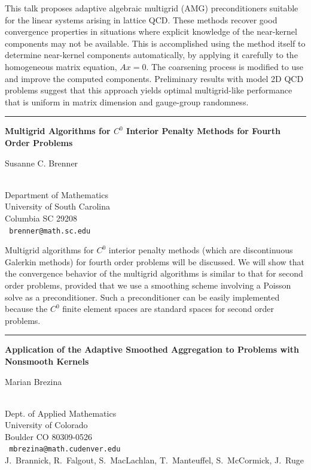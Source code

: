 \documentclass[twosided]{report}
\begin{document}
This talk proposes adaptive algebraic multigrid (AMG) preconditioners
suitable for the linear systems arising in lattice QCD.  These methods
recover good convergence properties in situations where explicit
knowledge of the near-kernel components may not be available.  This is
accomplished using the method itself to determine near-kernel
components automatically, by applying it carefully to the homogeneous
matrix equation, $Ax=0$.  The coarsening process is modified to use and
improve the computed components. Preliminary results with model 2D QCD
problems suggest that this approach yields optimal multigrid-like
performance that is uniform in matrix dimension and gauge-group
randomness.


\begin{center}

\rule{6in}{1pt}
\end{center}

\begin{center}
{\large			\label{brenner}
{\bf
Multigrid Algorithms for $C^0$ Interior Penalty Methods for Fourth Order
Problems
}

Susanne C. Brenner} \\
Department of Mathematics
\\
University of South Carolina
\\
Columbia SC 29208
\\ {\tt
brenner@math.sc.edu
}
\end{center}

Multigrid algorithms for $C^0$ interior penalty methods (which are
discontinuous Galerkin methods) for fourth order problems will be
discussed. We will show that the convergence behavior of the multigrid
algorithms is similar to that for second order problems, provided that
we use a smoothing scheme involving a Poisson solve as a
preconditioner. Such a preconditioner can be easily implemented because
the $C^0$ finite element spaces are standard spaces for second order
problems.


\begin{center} \rule{6in}{1pt} \end{center}
\newpage	%


\begin{center}
{\large			\label{brezina}
{\bf
Application of the Adaptive Smoothed Aggregation to Problems with
Nonsmooth Kernels
}

Marian Brezina} \\
Dept. of Applied Mathematics
\\
University of Colorado
\\
Boulder CO 80309-0526
\\ {\tt
mbrezina@math.cudenver.edu
}
\\
J.~Brannick,
R.~Falgout,
S.~MacLachlan,
T.~Manteuffel,
S.~McCormick,
J.~Ruge
\end{center}
\end{document}
